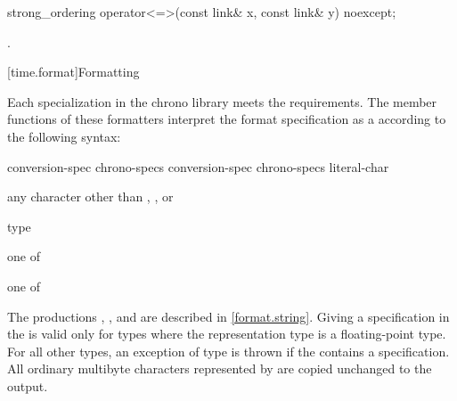 %
\begin{itemdecl}
strong_ordering operator<=>(const link& x, const link& y) noexcept;
\end{itemdecl}

\begin{itemdescr}
\pnum
\returns
{}.
\end{itemdescr}

[time.format]{Formatting}

\pnum
Each  specialization
in the chrono library
meets the  requirements.
The  member functions of these formatters
interpret the format specification
as a 
according to the following syntax:

\begin{ncbnf}
\br
       
\end{ncbnf}

\begin{ncbnf}
\br
    conversion-spec\br
    chrono-specs conversion-spec\br
    chrono-specs literal-char
\end{ncbnf}

\begin{ncbnf}
\br
    \textnormal{any character other than \tcode{\{}, \tcode{\}}, or \tcode{\%}}
\end{ncbnf}

\begin{ncbnf}
\br
    \terminal{\%}  type
\end{ncbnf}

\begin{ncbnf}
 \textnormal{one of}\br
\end{ncbnf}

\begin{ncbnf}
 \textnormal{one of}\br
    \br
\end{ncbnf}

The productions
,
, and
are described in \ref{format.string}.
Giving a  specification
in the 
is valid only for  types
where the representation type 
is a floating-point type.
For all other  types,
an exception of type  is thrown
if the 
contains a  specification.
All ordinary multibyte characters
represented by 
are copied unchanged to the output.

